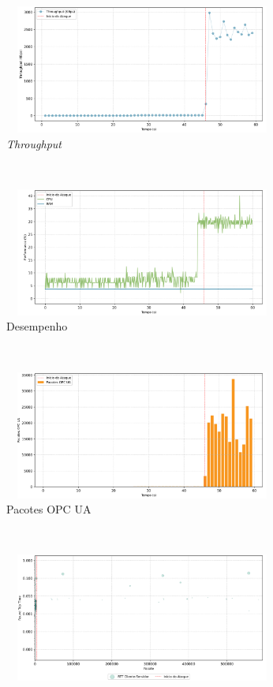 \begin{apendicesenv}
\begin{figure}[htbp!]
    \centering
    \begin{subfigure}[t]{0.5\textwidth}
        \centering
        \includegraphics[width=1\textwidth, height=120pt]{USPSC-img/output/cropped/1-dos_hping3-tput.png}
        \caption{\textit{Throughput}}
    \end{subfigure}%
    ~ 
    \begin{subfigure}[t]{0.5\textwidth}
        \centering
        \includegraphics[width=1\textwidth, height=120pt]{USPSC-img/output/cropped/1-dos_hping3-perf.png}
        \caption{Desempenho}
    \end{subfigure}%
    \\
    \begin{subfigure}[t]{0.5\textwidth}
        \centering
        \includegraphics[width=1\textwidth, height=120pt]{USPSC-img/output/cropped/1-dos_hping3-pack.png}
        \caption{Pacotes OPC UA}
    \end{subfigure}%
    ~
    \begin{subfigure}[t]{0.5\textwidth}
        \centering
        \includegraphics[width=1\textwidth, height=120pt]{USPSC-img/output/cropped/1-dos_hping3-rttp.png}

\end{subfigure}
\end{figure}
\end{apendicesenv}
